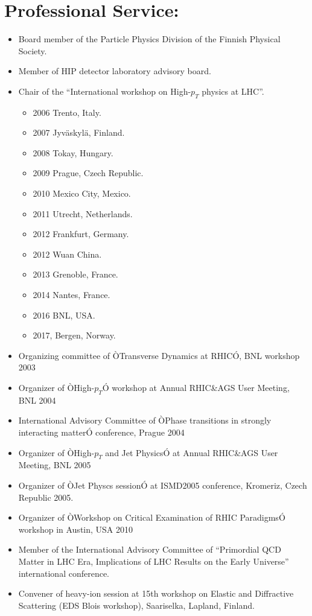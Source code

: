 \documentclass[12pt]{article}
\begin{document}
\section{Professional Service:}
\begin{itemize}
\item Board member of the Particle Physics Division of the Finnish Physical Society.
\item Member of HIP detector laboratory advisory board. 
\item Chair of the ``International workshop on High-$p_{T}$ physics at LHC''.
\begin{itemize}
	\item 2006 Trento, Italy.
	\item 2007 Jyv\"askyl\"a, Finland.
	\item 2008 Tokay, Hungary.
	\item 2009 Prague, Czech Republic.
	\item 2010  Mexico City, Mexico.
	\item 2011 Utrecht, Netherlands.
	\item 2012 Frankfurt, Germany.
	\item 2012 Wuan China.
	\item 2013 Grenoble, France.
	\item 2014 Nantes, France.
	\item 2016 BNL, USA.
	\item 2017, Bergen, Norway.
\end{itemize}
\item Organizing committee of ÒTransverse Dynamics at RHICÓ, BNL workshop 2003
\item Organizer of ÒHigh-$p_{T}$Ó workshop at Annual RHIC\&AGS User Meeting, BNL 2004
\item International Advisory Committee of ÒPhase transitions in strongly interacting matterÓ conference, Prague 2004
\item Organizer of ÒHigh-$p_{T}$ and Jet PhysicsÓ at Annual RHIC\&AGS User Meeting, BNL 2005
\item Organizer of ÒJet Physcs sessionÓ at ISMD2005 conference, Kromeriz, Czech Republic 2005.
\item Organizer of ÒWorkshop on Critical Examination of RHIC ParadigmsÓ workshop in Austin, USA 2010
\item Member of the International Advisory Committee of ``Primordial QCD Matter in LHC Era, Implications of LHC Results on the Early Universe'' international conference.
\item Convener of heavy-ion session at 15th workshop on Elastic and Diffractive Scattering (EDS Blois workshop), Saariselka, Lapland, Finland.
\end{itemize}
\end{document}

